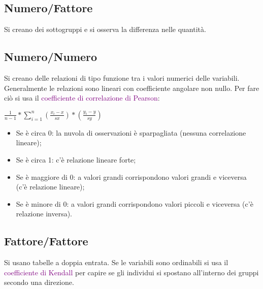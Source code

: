 \subsection{Numero/Fattore}

Si creano dei sottogruppi e si osserva la differenza nelle quantità.

\subsection{Numero/Numero}

Si creano delle relazioni di tipo funzione tra i valori numerici delle variabili. Generalmente le relazioni sono lineari con coefficiente angolare non nullo. Per fare ciò si usa il \textcolor{purple}{coefficiente di correlazione di Pearson}: 
\begin{center}
    $\frac{1}{n - 1} * \sum_{i = 1}^n (\frac{x_i - x}{sx}) * (\frac{y_i - y}{sy})$
\end{center}

\begin{itemize}
    \item Se è circa 0: la nuvola di osservazioni è sparpagliata (nessuna correlazione lineare);
    \item Se è circa 1: c'è relazione lineare forte;
    \item Se è maggiore di 0: a valori grandi corrispondono valori grandi e viceversa (c'è relazione lineare);
    \item Se è minore di 0: a valori grandi corrispondono valori piccoli e viceversa (c'è relazione inversa).
\end{itemize}


\subsection{Fattore/Fattore}

Si usano tabelle a doppia entrata. Se le variabili sono ordinabili si usa il \textcolor{purple}{coefficiente di Kendall} per capire se gli individui si spostano all'interno dei gruppi secondo una direzione.